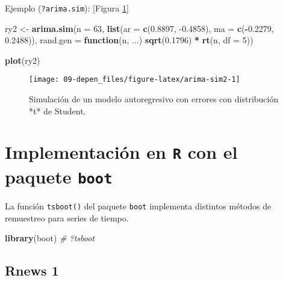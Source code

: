 \documentclass[
]{book}
\newenvironment{Shaded}{\begin{snugshade}}{\end{snugshade}}
\newcommand{\CommentTok}[1]{\textcolor[rgb]{0.56,0.35,0.01}{\textit{#1}}}
\newcommand{\ControlFlowTok}[1]{\textcolor[rgb]{0.13,0.29,0.53}{\textbf{#1}}}
\newcommand{\DataTypeTok}[1]{\textcolor[rgb]{0.13,0.29,0.53}{#1}}
\newcommand{\DecValTok}[1]{\textcolor[rgb]{0.00,0.00,0.81}{#1}}
\newcommand{\FloatTok}[1]{\textcolor[rgb]{0.00,0.00,0.81}{#1}}
\newcommand{\KeywordTok}[1]{\textcolor[rgb]{0.13,0.29,0.53}{\textbf{#1}}}
\newcommand{\NormalTok}[1]{#1}
\newcommand{\OperatorTok}[1]{\textcolor[rgb]{0.81,0.36,0.00}{\textbf{#1}}}
\newcommand{\StringTok}[1]{\textcolor[rgb]{0.31,0.60,0.02}{#1}}
\theoremstyle{definition}
\theoremstyle{definition}
\theoremstyle{definition}
\theoremstyle{remark}
\begin{document}
Ejemplo (\texttt{?arima.sim}):
{[}Figura \ref{fig:arima-sim2}{]}

\begin{Shaded}
\begin{Highlighting}[]
\NormalTok{ry2 <-}\StringTok{ }\KeywordTok{arima.sim}\NormalTok{(}\DataTypeTok{n =} \DecValTok{63}\NormalTok{, }\KeywordTok{list}\NormalTok{(}\DataTypeTok{ar =} \KeywordTok{c}\NormalTok{(}\FloatTok{0.8897}\NormalTok{, }\FloatTok{-0.4858}\NormalTok{), }
          \DataTypeTok{ma =} \KeywordTok{c}\NormalTok{(}\OperatorTok{-}\FloatTok{0.2279}\NormalTok{, }\FloatTok{0.2488}\NormalTok{)),}
          \DataTypeTok{rand.gen =} \ControlFlowTok{function}\NormalTok{(n, ...) }\KeywordTok{sqrt}\NormalTok{(}\FloatTok{0.1796}\NormalTok{) }\OperatorTok{*}\StringTok{ }\KeywordTok{rt}\NormalTok{(n, }\DataTypeTok{df =} \DecValTok{5}\NormalTok{))}

\KeywordTok{plot}\NormalTok{(ry2)}
\end{Highlighting}
\end{Shaded}

\begin{figure}[!htb]

{\centering \texttt{[image: 09-depen\_files/figure-latex/arima-sim2-1]} 

}

\caption{Simulación de un modelo autoregresivo con errores con distribución *t* de Student.}\label{fig:arima-sim2}
\end{figure}

\hypertarget{implementaciuxf3n-en-r-con-el-paquete-boot}{%
\section{\texorpdfstring{Implementación en \texttt{R} con el paquete \texttt{boot}}{Implementación en R con el paquete boot}}\label{implementaciuxf3n-en-r-con-el-paquete-boot}}

La función \texttt{tsboot()} del paquete \texttt{boot} implementa distintos métodos
de remuestreo para series de tiempo.

\begin{Shaded}
\begin{Highlighting}[]
\KeywordTok{library}\NormalTok{(boot)}
\CommentTok{# ?tsboot}
\end{Highlighting}
\end{Shaded}

\hypertarget{rnews-1}{%
\subsection{Rnews 1}\label{rnews-1}}
\end{document}
